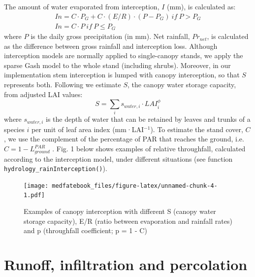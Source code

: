 \documentclass[]{book}
\begin{document}
The amount of water evaporated from interception, \(I\) (mm), is calculated as:
\begin{eqnarray}
In = C\cdot P_G+C\cdot(E/R)\cdot(P-P_G) \: {if}\: P > P_G \\
In = C\cdot P\: {if}\: P \leq P_G
\end{eqnarray}
where \(P\) is the daily gross precipitation (in mm). Net rainfall, \(Pr_{net}\), is
calculated as the difference between gross rainfall and interception loss.
Although interception models are normally applied to single-canopy stands, we
apply the sparse Gash model to the whole stand (including shrubs). Moreover, in
our implementation stem interception is lumped with canopy interception, so that
\(S\) represents both. Following \citet{Watanabe1996} we estimate \(S\), the
canopy water storage capacity, from adjusted LAI values:
\begin{equation}
S=\sum_{i}{s_{water,i}\cdot LAI_{i}^{\phi}}
\end{equation}
where \(s_{water,i}\) is the depth of water that can be retained by leaves and
trunks of a species \(i\) per unit of leaf area index (mm·LAI\(^{-1}\)). To estimate
the stand cover, \(C\), we use the complement of the percentage of PAR that reaches
the ground, i.e. \(C = 1 - L^{PAR}_{ground}\) \citep{Deguchi2006}. Fig. 1 below
shows examples of relative throughfall, calculated according to the interception
model, under different situations (see function \texttt{hydrology\_rainInterception()}).

\begin{figure}
\centering
\texttt{[image: medfatebook\_files/figure-latex/unnamed-chunk-4-1.pdf]}
\caption{\label{fig:unnamed-chunk-4}Examples of canopy interception with different S (canopy water storage capacity), E/R (ratio between evaporation and rainfall rates) and p (throughfall coefficient; p = 1 - C)}
\end{figure}

\hypertarget{runoff}{%
\section{Runoff, infiltration and percolation}\label{runoff}}
\end{document}

